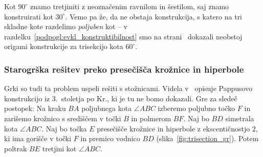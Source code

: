 Kot $90^\circ$ znamo tretjiniti z neoznačenim ravnilom in šestilom, saj znamo konstruirati kot $30^\circ$. Vemo pa že, da ne obstaja konstrukcija, s katero na tri skladne kote razdelimo \emph{poljuben} kot -- v razdelku~\ref{podpogl:evkl_konstruktibilnost} smo na strani~\pageref{dokaz_trisekcija} dokazali neobstoj origami konstrukcije za trisekcijo kota $60^\circ$.






\subsubsection*{Starogrška rešitev preko presečišča krožnice in hiperbole}

Grki so tudi ta problem uspeli rešiti s stožnicami. Videla v~\cite[str.\ 6--7]{videla1997} opisuje Pappusovo konstrukcijo iz $3$.\ stoletja po Kr., ki je tu ne bomo dokazali. Gre za sledeč postopek: Na kraku $BA$ poljubnega kota $\angle ABC$ izberemo poljubno točko $F$ in zarišemo krožnico s središčem v točki $B$ in polmerom $BF$. Naj bo $BD$ simetrala kota $\angle ABC$. Naj bo točka $E$ presečišče krožnice in hiperbole z ekscentičnostjo $2$, ki ima gorišče v točki $F$ in premico vodnico $BD$ (slika~\ref{fig:trisection_gr}). Potem poltrak $BE$ tretjini kot $\angle ABC$.

